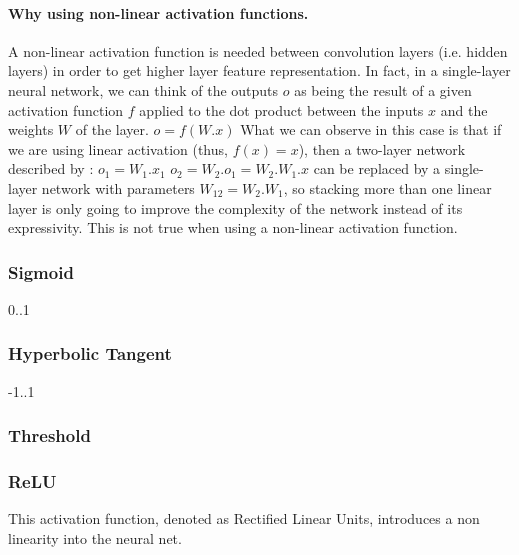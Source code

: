 \paragraph{Why using non-linear activation functions. }

A non-linear activation function is needed between convolution layers (i.e. hidden layers) in order to get higher layer feature representation. In fact, in a single-layer neural network, we can think of the outputs $o$ as being the result of a given activation function $f$ applied to the dot product between the inputs $x$ and the weights $W$ of the layer. $o = f(W . x)$
What we can observe in this case is that if we are using linear activation (thus, $f(x) = x$), then a two-layer network described by :
$ o_1 = W_1 . x_1 $
$ o_2 = W_2 . o_1 = W_2 . W_1 . x $
can be replaced by a single-layer network with parameters $W_{12} = W_2 . W_1$, so stacking more than one linear layer is only going to improve the complexity of the network instead of its expressivity. This is not true when using a non-linear activation function.

\subsubsection{Sigmoid}

0..1

\subsubsection{Hyperbolic Tangent}

-1..1

\subsubsection{Threshold}


\subsubsection{ReLU}

This activation function, denoted as Rectified Linear Units, introduces a non linearity into the neural net. 

  \begin{center}
  \end{center}

